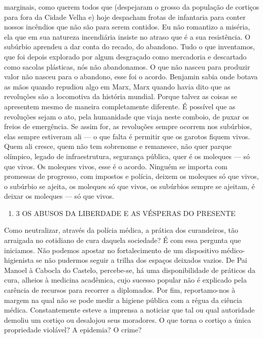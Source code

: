 marginais, como querem todos que (despejaram o grosso da população de
cortiços para fora da Cidade Velha e) hoje despacham frotas de
infantaria para conter nossos incêndios que não são para serem contidos.
Eu não romantizo a miséria, ela que em sua natureza incendiária insiste
no atraso que é a sua resistência. O subúrbio aprendeu a dar conta do
recado, do abandono. Tudo o que inventamos, que foi depois explorado por
algum desgraçado como mercadoria e descartado como sacolas plásticas,
nós não abandonamos. O que não nasceu para produzir valor não nasceu
para o abandono, esse foi o acordo. Benjamin sabia onde botava as mãos
quando repudiou algo em Marx, Marx quando havia dito que as revoluções
são a locomotiva da história mundial. Porque talvez as coisas se
apresentem mesmo de maneira completamente diferente. É possível que as
revoluções sejam o ato, pela humanidade que viaja neste comboio, de
puxar os freios de emergência. Se assim for, as revoluções sempre
ocorrem nos subúrbios, elas sempre estiveram ali --- o que falta é
permitir que os garotos fiquem vivos. Quem ali cresce, quem não tem
sobrenome e remanesce, não quer parque olímpico, legado de
infraestrutura, segurança pública, quer é os moleques --- só que vivos.
Os moleques vivos, esse é o acordo. Ninguém se importa com promessas de
progresso, com impostos e polícia, deixem os moleques só que vivos, o
subúrbio se ajeita, os moleques só que vivos, os subúrbios sempre se
ajeitam, é deixar os moleques --- só que vivos.

\begin{enumerate}
\def\labelenumi{\arabic{enumi}.}
\setcounter{enumi}{4}
\tightlist
\item
  3 OS ABUSOS DA LIBERDADE E AS VÉSPERAS DO PRESENTE
\end{enumerate}

Como neutralizar, através da polícia médica, a prática dos curandeiros,
tão arraigada no cotidiano de cura daquela sociedade? É com essa
pergunta que iniciamos. Não podemos apostar no fortalecimento de um
dispositivo médico-higienista se não pudermos seguir a trilha dos
espaços deixados vazios. De Pai Manoel à Cabocla do Castelo, percebe-se,
há uma disponibilidade de práticos da cura, alheios à medicina
acadêmica, cujo sucesso popular não é explicado pela carência de
recursos para recorrer a diplomados. Por fim, reportamo-nos à margem na
qual não se pode medir a higiene pública com a régua da ciência médica.
Constantemente esteve a imprensa a noticiar que tal ou qual autoridade
demoliu um cortiço ou desalojou seus moradores. O que torna o cortiço a
única propriedade violável? A epidemia? O crime?

